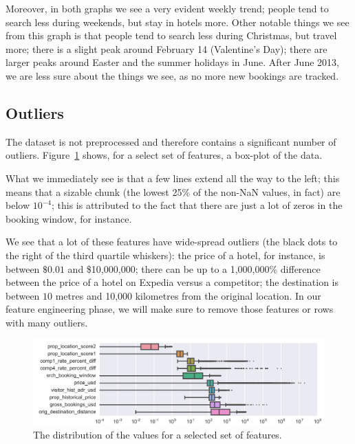 \documentclass[runningheads,a4paper]{llncs}
\begin{document}
Moreover, in both graphs we see a very evident weekly trend; people tend to search 
less during weekends, but stay in hotels more.  Other notable things we see from 
this graph is that people tend to search less during Christmas, but travel more; 
there is a slight peak around February 14 (Valentine's Day); there are larger peaks around Easter 
and the summer holidays in June. After June 2013, we are less sure about the things 
we see, as no more new bookings are tracked.

\subsection{Outliers}
The dataset is not preprocessed and therefore contains a significant number of 
outliers. Figure~\ref{fig:outliers} shows, for a select set of features, a 
box-plot of the data. 

What we immediately see is that a few lines extend all the way to the left; this 
means that a sizable chunk (the lowest 25\% of the non-NaN values, in fact) are 
below $10^{-4}$; this is attributed to the fact that there are just a lot of zeros 
in the booking window, for instance.

We see that a lot of these features have wide-spread outliers (the black dots to the right of the third quartile whiskers): 
the price of a hotel, for instance, is between $\$0.01$ and \$10,000,000; there 
can be up to a 1,000,000\% difference between the price of a hotel on Expedia 
versus a competitor; the destination is between $10$ metres and 10,000 kilometres from the original location. 
In our feature engineering phase, we will make sure to remove those features or rows with many outliers.
\begin{figure}[h]
	\includegraphics[width=\linewidth]{Pictures/outliers.png}
    \caption{The distribution of the values for a selected set of features.}
    \label{fig:outliers}
\end{figure}
\end{document}
